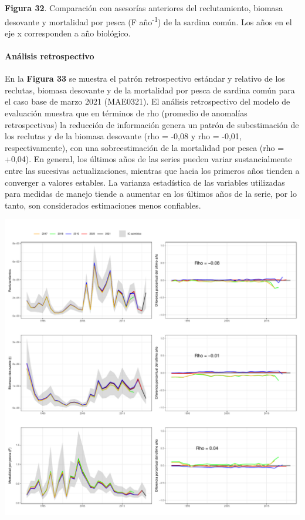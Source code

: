\documentclass[
  spanish,
]{article}
\begin{document}
\textbf{Figura 32}. Comparación con asesorías anteriores del
reclutamiento, biomasa desovante y mortalidad por pesca (F
año\textsuperscript{-1}) de la sardina común. Los años en el eje x
corresponden a año biológico. \vspace{0.5cm} \normalsize

\pagebreak

\hypertarget{anuxe1lisis-retrospectivo-1}{%
\paragraph{Análisis retrospectivo}\label{anuxe1lisis-retrospectivo-1}}

\quad

En la \textbf{Figura 33} se muestra el patrón retrospectivo estándar y
relativo de los reclutas, biomasa desovante y de la mortalidad por pesca
de sardina común para el caso base de marzo 2021 (MAE0321). El análisis
retrospectivo del modelo de evaluación muestra que en términos de rho
(promedio de anomalías retrospectivas) la reducción de información
genera un patrón de subestimación de los reclutas y de la biomasa
desovante (rho = -0,08 y rho = -0,01, respectivamente), con una
sobreestimación de la mortalidad por pesca (rho = +0,04). En general,
los últimos años de las series pueden variar sustancialmente entre las
sucesivas actualizaciones, mientras que hacia los primeros años tienden
a converger a valores estables. La varianza estadística de las variables
utilizadas para medidas de manejo tiende a aumentar en los últimos años
de la serie, por lo tanto, son considerados estimaciones menos
confiables.

\begin{center}\includegraphics{FigurasInforme_Marzo/F33_retrospectivo_marzo-1} \end{center}
\end{document}
